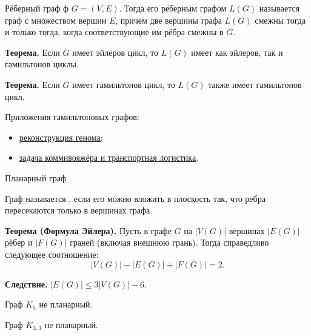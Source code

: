 \begin{frame}{Рёберный граф}
ф $G=(V,E)$. Тогда его рёберным графом $L(G)$ называется граф с множеством вершин $E$, причем две вершины графа $L(G)$ смежны тогда и только тогда, когда соответствующие им рёбра смежны в $G$.

{\bf Теорема.} Если $G$ имеет эйлеров цикл, то $L(G)$ имеет как эйлеров, так и гамильтонов циклы.

{\bf Теорема.} Если $G$ имеет гамильтонов цикл, то $L(G)$ также имеет гамильтонов цикл.

Приложения гамильтоновых графов:

\begin{itemize}

\item \href{http://kvant.mccme.ru/pdf/2014/2014-03.pdf}{\color{blue}\underline{реконструкция генома}};

\item \href{https://en.wikipedia.org/wiki/Travelling_salesman_problem
}{\color{blue}\underline{задача коммивояжёра и транспортная логистика}}.

\end{itemize}

\end{frame}

\begin{frame}{Планарный граф}

 Граф называется , если его можно вложить в плоскость так, что ребра пересекаются только в вершинах графа. 

{\bf Теорема (Формула Эйлера).} Пусть в графе $G$ на $|V(G)|$ вершинах $|E(G)|$  рёбер и $|F(G)|$ граней (включая внешнюю грань). Тогда справедливо следующее соотношение:
$$|V(G)|-|E(G)|+|F(G)|=2.$$

{\bf Следствие.} $|E(G)|\leq 3|V(G)|-6.$

\exmpl Граф $K_5$ не планарный.

 Граф $K_{3,3}$ не планарный.

\end{frame}

